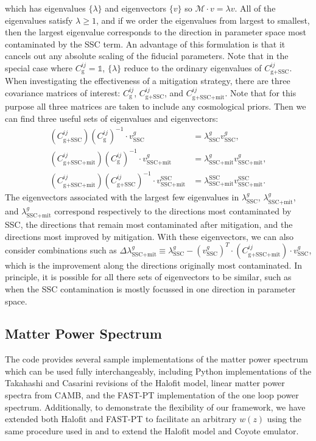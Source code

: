 \documentclass[a4paper,11pt]{article}
\begin{document}
which has eigenvalues $\{\lambda\}$ and eigenvectors $\{v\}$ so $\mathcal{M}\cdot v=\lambda v$. All of the eigenvalues satisfy $\lambda\ge1$, and if we order the eigenvalues from largest to smallest, then the largest eigenvalue corresponds to the direction in parameter space most contaminated by the SSC term. An advantage of this formulation is that it cancels out any absolute scaling of the fiducial parameters. Note that in the special case where $C^{ij}_{\text{g}}=\mathbb{1}$, $\{\lambda\}$ reduce to the ordinary eigenvalues of  $C^{ij}_{\text{g+SSC}}$. When investigating the effectiveness of a mitigation strategy, there are three covariance matrices of interest:  $C^{ij}_{\text{g}}$,  $C^{ij}_{\text{g+SSC}}$, and $C^{ij}_{\text{g+SSC+mit}}$. Note that for this purpose all three matrices are taken to include any cosmological priors. Then we can find three useful sets of eigenvalues and eigenvectors: 
\begin{align}\label{matrices}
(C^{ij}_{\text{g+SSC}})(C^{ij}_{\text{g}})^{-1}\cdot v^g_{\text{SSC}}&=\lambda^g_{\text{SSC}} v^g_{\text{SSC}}, \\
(C^{ij}_{\text{g+SSC+mit}})(C^{ij}_{\text{g}})^{-1}\cdot v^g_{\text{SSC+mit}}&=\lambda^g_{\text{SSC+mit}} v^g_{\text{SSC+mit}},\\
(C^{ij}_{\text{g+SSC+mit}})(C^{ij}_{\text{g+SSC}})^{-1}\cdot v^\text{SSC}_{\text{SSC+mit}}&=\lambda^\text{SSC}_{\text{SSC+mit}} v^\text{SSC}_{\text{SSC+mit}}.
\end{align}
 The eigenvectors associated with the largest few eigenvalues in $\lambda^g_{\text{SSC}}$, $\lambda^g_{\text{SSC+mit}}$, and $\lambda^g_{\text{SSC+mit}}$  correspond respectively to the directions most contaminated by SSC, the directions that remain most contaminated after mitigation, and the directions most improved by mitigation. With these eigenvectors, we can also consider combinations such as $\Delta \lambda^g_{\text{SSC+mit}}\equiv\lambda^g_{\text{SSC}}-(v^g_{\text{SSC}})^T\cdot (C^{ij}_{\text{g+SSC+mit}})\cdot v^g_{\text{SSC}}$, which is the improvement along the directions originally most contaminated. In principle, it is possible for all there sets of eigenvectors to be similar, such as when the SSC contamination is mostly focussed in one direction in parameter space. 

\subsection{Matter Power Spectrum}
\label{ssec:matter_power}
The code provides several sample implementations of the matter power spectrum which can be used fully interchangeably, including Python implementations of the Takahashi\cite{takahashi_halofit} and Casarini\cite{casarini_halofit} revisions of the Halofit\cite{smith_halofit} model, linear matter power spectra from CAMB\cite{camb}, and the FAST-PT\cite{fastpt} implementation of the one loop power spectrum. Additionally, to demonstrate the flexibility of our framework, we have extended both Halofit and FAST-PT to facilitate an arbitrary $w(z)$ using the same procedure used in \cite{casarini_halofit} and \cite{casarini_halofit_math} to extend the Halofit model and Coyote emulator\cite{coyote_emulator}. 
\end{document}
